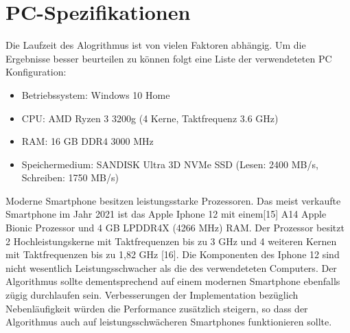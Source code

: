 \newpage
\section{PC-Spezifikationen}
Die Laufzeit des  Alogrithmus ist von vielen Faktoren abhängig. Um die Ergebnisse besser beurteilen zu können folgt eine Liste der verwendeteten
PC Konfiguration:
\begin{itemize}
\item Betriebssystem: Windows 10 Home 
\item CPU: AMD Ryzen 3 3200g (4 Kerne, Taktfrequenz 3.6 GHz) 
\item RAM: 16 GB DDR4 3000 MHz
\item Speichermedium: SANDISK Ultra 3D NVMe SSD (Lesen: 2400 MB/s, Schreiben: 1750 MB/s)
\end{itemize}

Moderne Smartphone besitzen leistungsstarke Prozessoren. Das meist verkaufte Smartphone im Jahr 2021 ist das Apple Iphone 12 mit einem[15]
A14 Apple Bionic Prozessor und 4 GB LPDDR4X (4266 MHz) RAM. Der Prozessor besitzt 2 Hochleistungskerne mit Taktfrequenzen bis zu 3 GHz und
4 weiteren Kernen mit Taktfrequenzen bis zu 1,82 GHz [16]. Die Komponenten des Iphone 12 sind nicht wesentlich Leistungsschwacher als die des
verwendeteten Computers. Der Algorithmus sollte dementsprechend auf einem modernen Smartphone ebenfalls zügig durchlaufen sein. Verbesserungen
der Implementation bezüglich Nebenläufigkeit würden die Performance zusätzlich steigern, so dass der Algorithmus auch auf leistungsschwächeren
Smartphones funktionieren sollte. 



